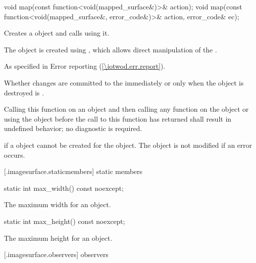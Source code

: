 %
\begin{itemdecl}
void map(const function<void(mapped_surface&)>& action);
void map(const function<void(mapped_surface&, error_code&)>& action, error_code& ec);
\end{itemdecl}
\begin{itemdescr}
\pnum
\effects
Creates a  object and calls  using it.

\pnum
The  object is created using , which allows direct manipulation of the \underlyingsurface.
	
\pnum
\throws
As specified in Error reporting (\ref{\iotwod.err.report}).
	
\pnum
\remarks
Whether changes are committed to the \underlyingsurface immediately or only when the  object is destroyed is \unspecnorm.
	
\pnum
Calling this function on an  object and then calling any function on the  object or using the  object before the call to this function has returned shall result in undefined behavior; no diagnostic is required.
	
\pnum
\errors
{} if a  object cannot be created for the  object. The  object is not modified if an error occurs.
\end{itemdescr}

 [\iotwod.imagesurface.staticmembers] { static members}

%
\begin{itemdecl}
static int max_width() const noexcept;
\end{itemdecl}
\begin{itemdescr}
\pnum
\returns
The maximum width for an  object.
\end{itemdescr}

%
\begin{itemdecl}
static int max_height() const noexcept;
\end{itemdecl}
\begin{itemdescr}
\pnum
\returns
The maximum height for an  object.
\end{itemdescr}
    

 [\iotwod.imagesurface.observers] { observers}

